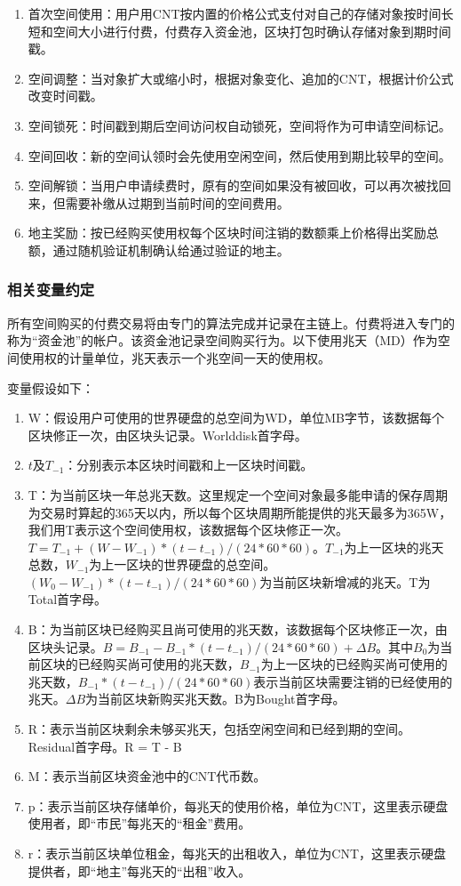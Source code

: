 \documentclass[a4paper,12pt]{article}
\begin{document}
\begin{enumerate}
\item 首次空间使用：用户用CNT按内置的价格公式支付对自己的存储对象按时间长短和空间大小进行付费，付费存入资金池，区块打包时确认存储对象到期时间戳。
\item 空间调整：当对象扩大或缩小时，根据对象变化、追加的CNT，根据计价公式改变时间戳。
\item 空间锁死：时间戳到期后空间访问权自动锁死，空间将作为可申请空间标记。
\item 空间回收：新的空间认领时会先使用空闲空间，然后使用到期比较早的空间。
\item 空间解锁：当用户申请续费时，原有的空间如果没有被回收，可以再次被找回来，但需要补缴从过期到当前时间的空间费用。
\item 地主奖励：按已经购买使用权每个区块时间注销的数额乘上价格得出奖励总额，通过随机验证机制确认给通过验证的地主。
\end{enumerate}


\subsubsection{相关变量约定}

所有空间购买的付费交易将由专门的算法完成并记录在主链上。付费将进入专门的称为“资金池”的帐户。该资金池记录空间购买行为。以下使用兆天（MD）作为空间使用权的计量单位，兆天表示一个兆空间一天的使用权。

变量假设如下：

\begin{enumerate}
\item W：假设用户可使用的世界硬盘的总空间为WD，单位MB字节，该数据每个区块修正一次，由区块头记录。Worlddisk首字母。
\item $t$及$T_{-1}$：分别表示本区块时间戳和上一区块时间戳。 
\item T：为当前区块一年总兆天数。这里规定一个空间对象最多能申请的保存周期为交易时算起的365天以内，所以每个区块周期所能提供的兆天最多为365W，我们用T表示这个空间使用权，该数据每个区块修正一次。$T = T_{-1}+(W-W_{-1})*(t-t_{-1})/(24*60*60)$。$T_{-1}$为上一区块的兆天总数，$W_{-1}$为上一区块的世界硬盘的总空间。$(W_0-W_{-1})*(t-t_{-1})/(24*60*60)$为当前区块新增减的兆天。T为Total首字母。
\item B：为当前区块已经购买且尚可使用的兆天数，该数据每个区块修正一次，由区块头记录。$B = B_{-1}-B_{-1}*(t-t_{-1})/(24*60*60)+\Delta B$。其中$B_0$为当前区块的已经购买尚可使用的兆天数，$B_{-1}$为上一区块的已经购买尚可使用的兆天数，$B_{-1}*(t-t_{-1})/(24*60*60)$表示当前区块需要注销的已经使用的兆天。$\Delta B$为当前区块新购买兆天数。B为Bought首字母。
\item R：表示当前区块剩余未够买兆天，包括空闲空间和已经到期的空间。Residual首字母。R = T - B
\item M：表示当前区块资金池中的CNT代币数。
\item p：表示当前区块存储单价，每兆天的使用价格，单位为CNT，这里表示硬盘使用者，即“市民”每兆天的“租金”费用。
\item r：表示当前区块单位租金，每兆天的出租收入，单位为CNT，这里表示硬盘提供者，即“地主”每兆天的“出租”收入。
\end{enumerate}
\end{document}
